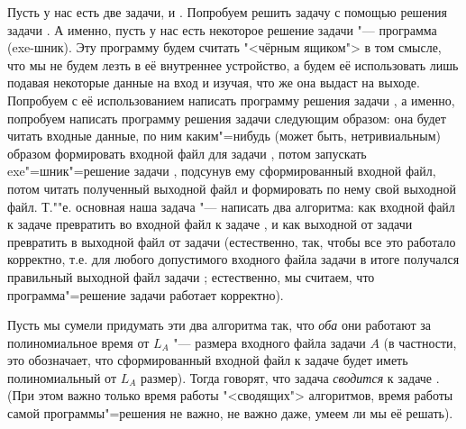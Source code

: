 { Пусть у нас есть две задачи, \A{}  и \B. Попробуем 
решить задачу \A{} с помощью решения задачи \B. А именно, пусть у нас есть 
некоторое решение задачи \B{} "--- программа (exe-шник). Эту программу будем считать 
"<чёрным ящиком"> в том смысле, что мы не будем лезть в её внутреннее устройство, а будем её использовать лишь подавая некоторые данные на вход и изучая, что же она выдаст на выходе. Попробуем с 
её использованием написать программу решения задачи \A, а именно, попробуем написать 
программу решения задачи \A{} следующим образом: она будет читать входные данные, 
по ним каким"=нибудь (может быть, нетривиальным) образом формировать входной 
файл для задачи \B, потом запускать exe"=шник"=решение задачи \B{}, подсунув ему
сформированный входной файл, потом читать полученный выходной файл и 
формировать по нему свой выходной файл. Т.""е. основная наша задача "--- 
написать два алгоритма: как входной файл к задаче \A{} превратить во входной файл 
к задаче \B, и как выходной от задачи \B{} превратить в выходной файл от задачи 
\A{} (естественно, так, чтобы все это работало корректно, т.е. для любого 
допустимого входного файла задачи \A{} в итоге получался правильный выходной файл задачи 
\A; естественно, мы считаем, что программа"=решение задачи \B{} работает 
корректно). 

Пусть мы сумели придумать эти два алгоритма так, что \textit{оба} они работают 
за полиномиальное время от $L_A$ "--- размера входного файла задачи $A$ (в 
частности, это обозначает, что сформированный входной файл к задаче \B{} будет 
иметь полиномиальный от $L_A$ размер). Тогда говорят, что задача \A{} 
\textit{сводится} к задаче \B. (При этом важно только время работы "<сводящих"> 
алгоритмов, время работы самой программы"=решения \B{} не важно, не важно даже, 
умеем ли мы её решать).


}
